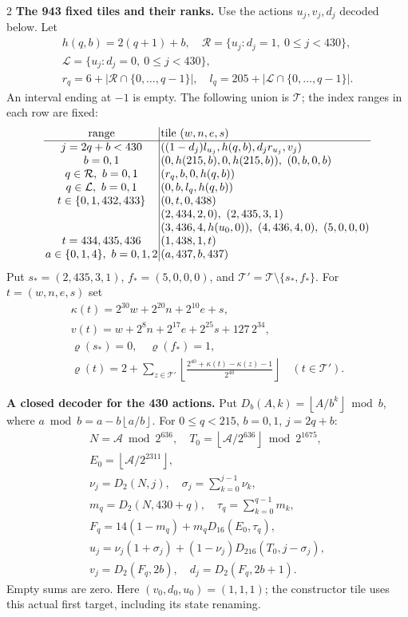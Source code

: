 \documentclass[10pt]{article}
\newcommand{\fl}[1]{\left\lfloor#1\right\rfloor}
\newcommand{\rg}[2]{\{#1,\ldots,#2\}}
\begin{document}
\begin{multicols}{2}
\textbf{The 943 fixed tiles and their ranks.}
Use the actions $u_j,v_j,d_j$ decoded below. Let
\[
\begin{gathered}
h(q,b)=2(q+1)+b,\quad
\mathcal R=\{u_j:d_j=1,\ 0\le j<430\},\\
\mathcal L=\{u_j:d_j=0,\ 0\le j<430\},\\
r_q=6+|\mathcal R\cap\rg0{q-1}|,\quad
l_q=205+|\mathcal L\cap\rg0{q-1}|.
\end{gathered}
\]
An interval ending at $-1$ is empty. The following union is $\mathcal T$;
the index ranges in each row are fixed:
\[
\setlength{\arraycolsep}{1.4pt}\begin{array}{c|l}
\text{range}&\text{tile }(w,n,e,s)\\\hline
j=2q+b<430&((1-d_j)l_{u_j},h(q,b),d_jr_{u_j},v_j)\\
b=0,1&(0,h(215,b),0,h(215,b)),\ (0,b,0,b)\\
q\in\mathcal R,\ b=0,1&(r_q,b,0,h(q,b))\\
q\in\mathcal L,\ b=0,1&(0,b,l_q,h(q,b))\\
t\in\{0,1,432,433\}&(0,t,0,438)\\
&(2,434,2,0),\ (2,435,3,1)\\
&(3,436,4,h(u_0,0)),\ (4,436,4,0),\ (5,0,0,0)\\
t=434,435,436&(1,438,1,t)\\
a\in\{0,1,4\},\ b=0,1,2&(a,437,b,437)
\end{array}
\]
Put $s_*=(2,435,3,1)$, $f_*=(5,0,0,0)$, and $\mathcal T'=\mathcal T\setminus\{s_*,f_*\}$.
For $t=(w,n,e,s)$ set
\[
\begin{gathered}
\kappa(t)=2^{30}w+2^{20}n+2^{10}e+s,\\
v(t)=w+2^8n+2^{17}e+2^{25}s+127\,2^{34},\\
\varrho(s_*)=0,\quad\varrho(f_*)=1,\\
\varrho(t)=2+\sum_{z\in\mathcal T'}
 \fl{\frac{2^{40}+\kappa(t)-\kappa(z)-1}{2^{40}}}
 \quad(t\in\mathcal T').
\end{gathered}
\]

\textbf{A closed decoder for the 430 actions.}
Put $D_b(A,k)=\fl{A/b^k}\bmod b$, where
$a\bmod b=a-b\fl{a/b}$. For $0\le q<215$, $b=0,1$, $j=2q+b$:
\[
\begin{gathered}
N=\mathcal A\bmod2^{636},\quad
T_0=\fl{\mathcal A/2^{636}}\bmod2^{1675},\\
E_0=\fl{\mathcal A/2^{2311}},\\
\nu_j=D_2(N,j),\quad \sigma_j=\sum_{k=0}^{j-1}\nu_k,\\
m_q=D_2(N,430+q),\quad \tau_q=\sum_{k=0}^{q-1}m_k,\\
F_q=14(1-m_q)+m_qD_{16}(E_0,\tau_q),\\
u_j=\nu_j(1+\sigma_j)+(1-\nu_j)D_{216}(T_0,j-\sigma_j),\\
v_j=D_2(F_q,2b),\quad d_j=D_2(F_q,2b+1).
\end{gathered}
\]
Empty sums are zero. Here $(v_0,d_0,u_0)=(1,1,1)$; the constructor tile
uses this actual first target, including its state renaming.


\end{multicols}
\end{document}
